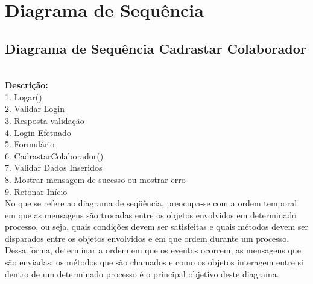\documentclass[12pt]{report}
\begin{document}
\section{Diagrama de Sequência}

\subsection{Diagrama de Sequência Cadrastar Colaborador}
\\

{\bf Descrição:}\\
1. Logar()\\
2. Validar Login\\
3. Resposta validação\\
4. Login Efetuado\\
5. Formulário\\
6. CadrastarColaborador()\\
7. Validar Dados Inseridos\\
8. Mostrar mensagem de sucesso ou mostrar erro\\
9. Retonar Início\\


No que se refere ao diagrama de seqüência, preocupa-se com a ordem temporal
em que as mensagens são trocadas entre os objetos envolvidos em determinado
processo, ou seja, quais condições devem ser satisfeitas e quais métodos devem
ser disparados entre os objetos envolvidos e em que ordem durante um processo.
Dessa forma, determinar a ordem em que os eventos ocorrem, as mensagens que são
enviadas, os métodos que são chamados e como os objetos interagem entre si dentro
de um determinado processo é o principal objetivo deste diagrama.
\end{document}
